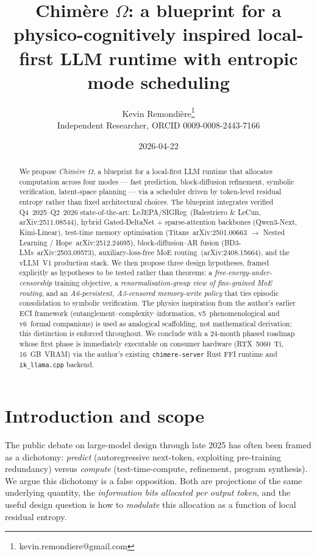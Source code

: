 \documentclass[10pt,a4paper]{article}
\title{Chim\`ere $\Omega$: a blueprint for a physico-cognitively inspired
local-first LLM runtime with entropic mode scheduling}
\author{Kevin Remondi\`ere\thanks{kevin.remondiere@gmail.com}\\
\small Independent Researcher, ORCID 0009-0008-2443-7166}
\date{2026-04-22}
\theoremstyle{remark}
\begin{document}
\maketitle

\begin{abstract}
We propose \emph{Chim\`ere $\Omega$}, a blueprint for a local-first LLM
runtime that allocates computation across four modes --- fast
prediction, block-diffusion refinement, symbolic verification,
latent-space planning --- via a scheduler driven by token-level
residual entropy rather than fixed architectural choices. The
blueprint integrates verified Q4~2025--Q2~2026 state-of-the-art:
LeJEPA/SIGReg~(Balestriero \& LeCun, arXiv:2511.08544), hybrid
Gated-DeltaNet + sparse-attention backbones (Qwen3-Next,
Kimi-Linear), test-time memory optimisation
(Titans~arXiv:2501.00663 $\to$ Nested Learning / Hope~arXiv:2512.24695),
block-diffusion--AR fusion (BD3-LMs~arXiv:2503.09573),
auxiliary-loss-free MoE routing~(arXiv:2408.15664), and the vLLM~V1
production stack. We then propose three design hypotheses, framed
explicitly as hypotheses to be tested rather than theorems: a
\emph{free-energy-under-censorship} training objective, a
\emph{renormalisation-group view of fine-grained MoE routing}, and an
\emph{A6-persistent, A3-censored memory-write policy} that ties
episodic consolidation to symbolic verification. The physics
inspiration from the author's earlier ECI framework
(entanglement--complexity--information,
v5~phenomenological and v6~formal companions) is used as analogical
scaffolding, not mathematical derivation; this distinction is
enforced throughout. We conclude with a 24-month phased roadmap
whose first phase is immediately executable on consumer hardware
(RTX~5060~Ti, 16~GB~VRAM) via the author's existing
\texttt{chimere-server} Rust FFI runtime and \texttt{ik\_llama.cpp}
backend.
\end{abstract}

\section{Introduction and scope}
\label{sec:intro}

The public debate on large-model design through late 2025 has often
been framed as a dichotomy: \emph{predict} (autoregressive next-token,
exploiting pre-training redundancy) versus \emph{compute}
(test-time-compute, refinement, program synthesis). We argue this
dichotomy is a false opposition. Both are projections of the same
underlying quantity, the \emph{information bits allocated per output
token}, and the useful design question is how to \emph{modulate} this
allocation as a function of local residual entropy.
\end{document}
